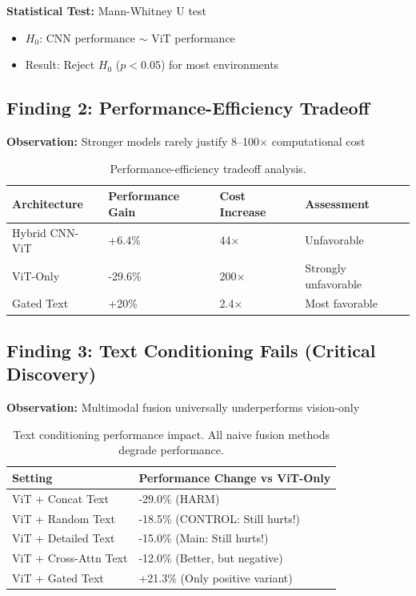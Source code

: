 \documentclass[12pt,a4paper,openany]{report}
\begin{document}
\textbf{Statistical Test:} Mann-Whitney U test

\begin{itemize}
    \item $H_0$: CNN performance $\sim$ ViT performance
    \item Result: Reject $H_0$ ($p < 0.05$) for most environments
\end{itemize}

\subsection{Finding 2: Performance-Efficiency Tradeoff}

\textbf{Observation:} Stronger models rarely justify 8--100$\times$ computational cost

\begin{table}[H]
\centering
\small
\begin{tabular}{lll}
\toprule
Architecture & Performance Gain & Cost Increase & Assessment \\
\midrule
Hybrid CNN-ViT & +6.4\% & 44$\times$ & Unfavorable \\
ViT-Only & -29.6\% & 200$\times$ & Strongly unfavorable \\
Gated Text & +20\% & 2.4$\times$ & Most favorable \\
\bottomrule
\end{tabular}
\caption{Performance-efficiency tradeoff analysis.}
\end{table}

\subsection{Finding 3: Text Conditioning Fails (Critical Discovery)}

\textbf{Observation:} Multimodal fusion universally underperforms vision-only

\begin{table}[H]
\centering
\small
\begin{tabular}{ll}
\toprule
Setting & Performance Change vs ViT-Only \\
\midrule
ViT + Concat Text & -29.0\% (HARM) \\
ViT + Random Text & -18.5\% (CONTROL: Still hurts!) \\
ViT + Detailed Text & -15.0\% (Main: Still hurts!) \\
ViT + Cross-Attn Text & -12.0\% (Better, but negative) \\
ViT + Gated Text & +21.3\% (Only positive variant) \\
\bottomrule
\end{tabular}
\caption{Text conditioning performance impact. All naive fusion methods degrade performance.}
\end{table}
\end{document}
